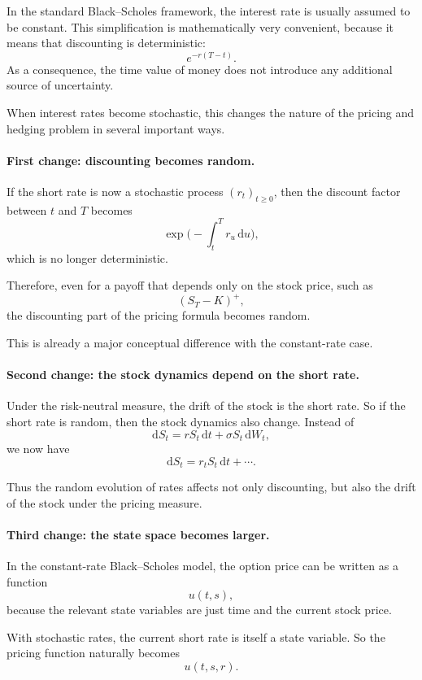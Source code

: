 \documentclass[11pt]{article}
\theoremstyle{plain}
\theoremstyle{definition}
\theoremstyle{remark}
\begin{document}
In the standard Black--Scholes framework, the interest rate is usually
assumed to be constant.
This simplification is mathematically very convenient, because it means
that discounting is deterministic:
\[
e^{-r(T-t)}.
\]
As a consequence, the time value of money does not introduce any
additional source of uncertainty.

When interest rates become stochastic, this changes the nature of the
pricing and hedging problem in several important ways.

\paragraph{First change: discounting becomes random.}
If the short rate is now a stochastic process \((r_t)_{t\ge0}\), then
the discount factor between \(t\) and \(T\) becomes
\[
\exp\!\Big(-\int_t^T r_u\,\mathrm{d}u\Big),
\]
which is no longer deterministic.

Therefore, even for a payoff that depends only on the stock price, such
as
\[
(S_T-K)^+,
\]
the discounting part of the pricing formula becomes random.

This is already a major conceptual difference with the constant-rate
case.

\paragraph{Second change: the stock dynamics depend on the short rate.}
Under the risk-neutral measure, the drift of the stock is the short
rate.
So if the short rate is random, then the stock dynamics also change.
Instead of
\[
\mathrm{d}S_t=rS_t\,\mathrm{d}t+\sigma S_t\,\mathrm{d}W_t,
\]
we now have
\[
\mathrm{d}S_t=r_tS_t\,\mathrm{d}t+\cdots.
\]

Thus the random evolution of rates affects not only discounting, but
also the drift of the stock under the pricing measure.

\paragraph{Third change: the state space becomes larger.}
In the constant-rate Black--Scholes model, the option price can be
written as a function
\[
u(t,s),
\]
because the relevant state variables are just time and the current stock
price.

With stochastic rates, the current short rate is itself a state
variable.
So the pricing function naturally becomes
\[
u(t,s,r).
\]
\end{document}
